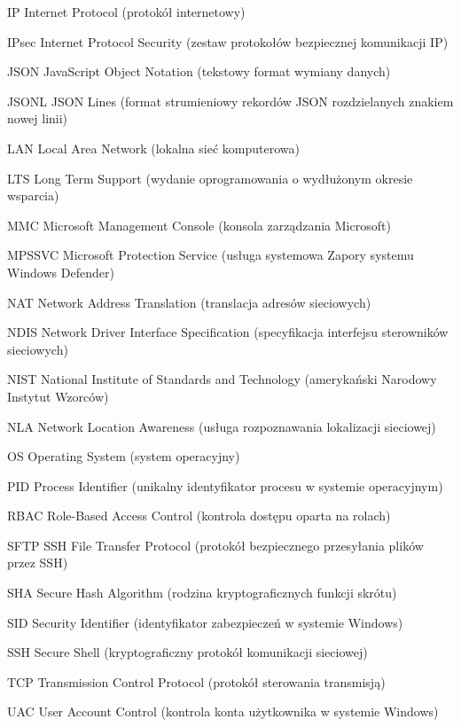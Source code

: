 \begin{abbreviations}
    \item[IP]      Internet Protocol (protokół internetowy)
    \item[IPsec]   Internet Protocol Security (zestaw protokołów bezpiecznej komunikacji IP)
    \item[JSON]    JavaScript Object Notation (tekstowy format wymiany danych)
    \item[JSONL]   JSON Lines (format strumieniowy rekordów JSON rozdzielanych znakiem nowej linii)
    \item[LAN]     Local Area Network (lokalna sieć komputerowa)
    \item[LTS]     Long Term Support (wydanie oprogramowania o wydłużonym okresie wsparcia)
    \item[MMC]     Microsoft Management Console (konsola zarządzania Microsoft)
    \item[MPSSVC]  Microsoft Protection Service (usługa systemowa Zapory systemu Windows Defender)
    \item[NAT]     Network Address Translation (translacja adresów sieciowych)
    \item[NDIS]    Network Driver Interface Specification (specyfikacja interfejsu sterowników sieciowych)
    \item[NIST]    National Institute of Standards and Technology (amerykański Narodowy Instytut Wzorców)
    \item[NLA]     Network Location Awareness (usługa rozpoznawania lokalizacji sieciowej)
    \item[OS]      Operating System (system operacyjny)
    \item[PID]     Process Identifier (unikalny identyfikator procesu w systemie operacyjnym)
    \item[RBAC]    Role-Based Access Control (kontrola dostępu oparta na rolach)
    \item[SFTP]    SSH File Transfer Protocol (protokół bezpiecznego przesyłania plików przez SSH)
    \item[SHA]     Secure Hash Algorithm (rodzina kryptograficznych funkcji skrótu)
    \item[SID]     Security Identifier (identyfikator zabezpieczeń w systemie Windows)
    \item[SSH]     Secure Shell (kryptograficzny protokół komunikacji sieciowej)
    \item[TCP]     Transmission Control Protocol (protokół sterowania transmisją)
    \item[UAC]     User Account Control (kontrola konta użytkownika w systemie Windows)

\end{abbreviations}
